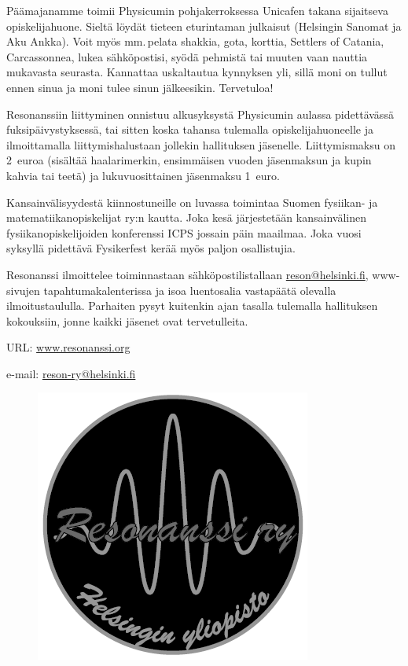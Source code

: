 \documentclass[a5paper, 8pt, twocolumn]{book} %
\numberwithin{equation}{section}
\begin{document}
Päämajanamme toimii Physicumin pohjakerroksessa
Unicafen takana sijaitseva
opiskelijahuone. Sieltä löydät tieteen eturintaman
julkaisut (Helsingin Sanomat ja
Aku Ankka). Voit myös mm.\,pelata shakkia,
gota, korttia, Settlers of Catania, Carcassonnea,
lukea sähköpostisi, syödä pehmistä
tai muuten vaan nauttia mukavasta
seurasta. Kannattaa uskaltautua kynnyksen
yli, sillä moni on tullut ennen sinua ja moni
tulee sinun jälkeesikin. Tervetuloa!

Resonanssiin liittyminen onnistuu alkusyksystä
Physicumin aulassa pidettävässä
fuksipäivystyksessä, tai sitten koska
tahansa tulemalla opiskelijahuoneelle ja
ilmoittamalla liittymishalustaan jollekin
hallituksen jäsenelle. Liittymismaksu on
2~euroa (sisältää haalarimerkin, ensimmäisen
vuoden jäsenmaksun ja kupin kahvia
tai teetä) ja lukuvuosittainen jäsenmaksu 1~euro.

Kansainvälisyydestä kiinnostuneille on
luvassa toimintaa Suomen fysiikan- ja matematiikan\-opiskelijat
ry:n kautta. Joka kesä järjestetään
kansainvälinen fysiikanopiskelijoiden konferenssi
ICPS jossain päin maailmaa. Joka
vuosi syksyllä pidettävä Fysikerfest kerää
myös paljon osallistujia.

Resonanssi ilmoittelee toiminnastaan
sähkö\-posti\-listallaan \url{reson@helsinki.fi},
www-sivujen tapahtuma\-kalenterissa ja isoa
luento\-salia vasta\-päätä olevalla ilmoitus\-taululla.
Parhaiten pysyt kuitenkin ajan tasalla
tulemalla hallituksen kokouksiin, jonne
kaikki jäsenet ovat tervetulleita.

\noindent URL: \url{www.resonanssi.org}

\noindent e-mail: \url{reson-ry@helsinki.fi}

\begin{figure}[!b]
	\centering
	\includegraphics[width=0.9\columnwidth]{resonanssi.png}
\end{figure}
\end{document}
